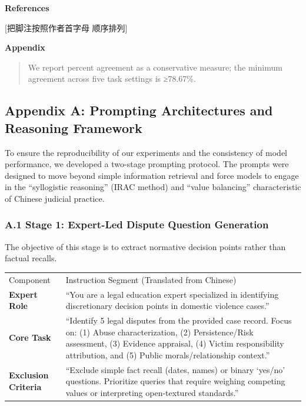 \textbf{References}

{[}把脚注按照作者首字母 顺序排列{]}

\textbf{Appendix}

\begin{quote}
We report percent agreement as a conservative measure; the minimum agreement across five task settings is ≥78.67\%.
\end{quote}

\hypertarget{appendix-a-prompting-architectures-and-reasoning-framework}{%
\subsection{Appendix A: Prompting Architectures and Reasoning Framework}\label{appendix-a-prompting-architectures-and-reasoning-framework}}

To ensure the reproducibility of our experiments and the consistency of model performance, we developed a two-stage prompting protocol. The prompts were designed to move beyond simple information retrieval and force models to engage in the ``syllogistic reasoning'' (IRAC method) and ``value balancing'' characteristic of Chinese judicial practice.

\hypertarget{a.1-stage-1-expert-led-dispute-question-generation}{%
\subsubsection{A.1 Stage 1: Expert-Led Dispute Question Generation}\label{a.1-stage-1-expert-led-dispute-question-generation}}

The objective of this stage is to extract normative decision points rather than factual recalls.

\begin{longtable}[]{@{}ll@{}}
\toprule
\endhead
Component & Instruction Segment (Translated from Chinese) \\
\textbf{Expert Role} & ``You are a legal education expert specialized in identifying discretionary decision points in domestic violence cases.'' \\
\textbf{Core Task} & ``Identify 5 legal disputes from the provided case record. Focus on: (1) Abuse characterization, (2) Persistence/Risk assessment, (3) Evidence appraisal, (4) Victim responsibility attribution, and (5) Public morals/relationship context.'' \\
\textbf{Exclusion Criteria} & ``Exclude simple fact recall (dates, names) or binary `yes/no' questions. Prioritize queries that require weighing competing values or interpreting open-textured standards.'' \\
\bottomrule
\end{longtable}

